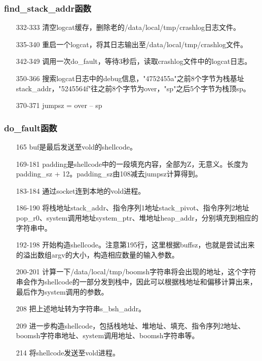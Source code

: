 \subsubsection{find\_stack\_addr函数}

\begin{itemize}
\item[332-333] 清空logcat缓存，删除老的/data/local/tmp/crashlog日志文件。
\item[335-340] 重启一个logcat，将其日志输出至/data/local/tmp/crashlog文件。
\item[342-349] 调用一次do\_fault，等待3秒后，读取crashlog文件中的logcat日志。
\item[350-366] 搜索logcat日志中的debug信息，"4752455a"之前8个字节为栈基址stack\_addr，"5245564f"往之前8个字节为over，"sp"之后5个字节为栈顶sp。
\item[370-371] jumpsz = over – sp
\end{itemize}

\subsubsection{do\_fault函数}

\begin{itemize}
\item[165] buf是最后发送至vold的shellcode。
\item[169-181] padding是shellcode中的一段填充内容，全部为Z，无意义。长度为padding\_sz + 12。padding\_sz由108减去jumpsz计算得到。
\item[183-184] 通过socket连到本地的vold进程。
\item[186-190] 将栈地址stack\_addr、指令序列1地址stack\_pivot、指令序列2地址pop\_r0、system调用地址system\_ptr、堆地址heap\_addr，分别填充到相应的字符串中。
\item[192-198] 开始构造shellcode。注意第195行，这里根据buffsz，也就是尝试出来的溢出数组argv的大小，构造相应数量的输入参数。
\item[200-201] 计算一下/data/local/tmp/boomsh字符串将会出现的地址，这个字符串会作为shellcode的一部分发到栈中，因此可以根据栈地址和偏移计算出来，最后作为system调用的参数。
\item[208] 把上述地址转为字符串s\_bsh\_addr。
\item[209] 进一步构造shellcode，包括栈地址、堆地址、填充、指令序列2地址、boomsh字符串地址、system调用地址、boomsh字符串等。
\item[214] 将shellcode发送至vold进程。
\end{itemize}

